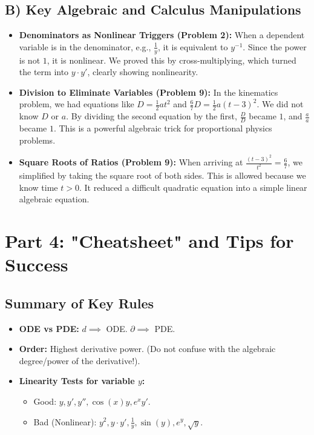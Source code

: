\documentclass[11pt]{article}
\begin{document}
\subsection{B) Key Algebraic and Calculus Manipulations}
\begin{itemize}
    \item \textbf{Denominators as Nonlinear Triggers (Problem 2):} When a dependent variable is in the denominator, e.g., $\frac{1}{y}$, it is equivalent to $y^{-1}$. Since the power is not $1$, it is nonlinear. We proved this by cross-multiplying, which turned the term into $y \cdot y'$, clearly showing nonlinearity.
    \item \textbf{Division to Eliminate Variables (Problem 9):} In the kinematics problem, we had equations like $D = \frac{1}{2} a t^2$ and $\frac{6}{7}D = \frac{1}{2} a (t-3)^2$. We did not know $D$ or $a$. By dividing the second equation by the first, $\frac{D}{D}$ became $1$, and $\frac{a}{a}$ became $1$. This is a powerful algebraic trick for proportional physics problems.
    \item \textbf{Square Roots of Ratios (Problem 9):} When arriving at $\frac{(t-3)^2}{t^2} = \frac{6}{7}$, we simplified by taking the square root of both sides. This is allowed because we know time $t > 0$. It reduced a difficult quadratic equation into a simple linear algebraic equation.
\end{itemize}

\section{Part 4: "Cheatsheet" and Tips for Success}

\subsection*{Summary of Key Rules}
\begin{itemize}
    \item \textbf{ODE vs PDE:} $d \implies$ ODE. $\partial \implies$ PDE.
    \item \textbf{Order:} Highest derivative power. (Do not confuse with the algebraic degree/power of the derivative!).
    \item \textbf{Linearity Tests for variable $y$:}
        \begin{itemize}
            \item Good: $y, y', y'', \cos(x)y, e^x y'$.
            \item Bad (Nonlinear): $y^2, y \cdot y', \frac{1}{y}, \sin(y), e^y, \sqrt{y}$.
        \end{itemize}
\end{itemize}
\end{document}
